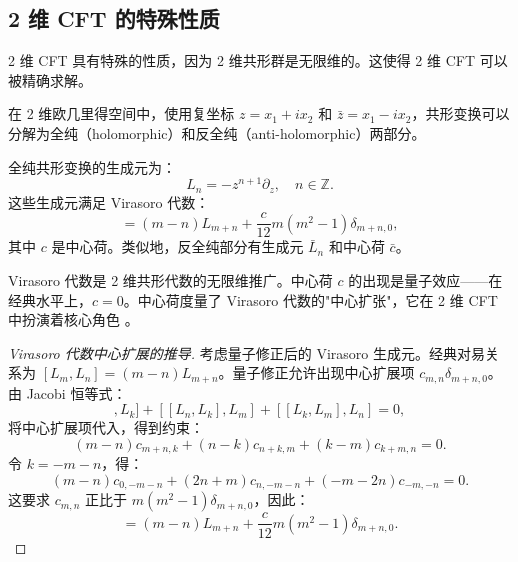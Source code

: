 \subsection{2 维 CFT 的特殊性质}

2 维 CFT 具有特殊的性质，因为 2 维共形群是无限维的。这使得 2 维 CFT 可以被精确求解。

\begin{definition}[Virasoro 代数]
在 2 维欧几里得空间中，使用复坐标 $z = x_1 + ix_2$ 和 $\bar{z} = x_1 - ix_2$，共形变换可以分解为全纯（holomorphic）和反全纯（anti-holomorphic）两部分。

全纯共形变换的生成元为：
\begin{equation}
    L_n = -z^{n+1} \partial_z, \quad n \in \mathbb{Z}.
\end{equation}
这些生成元满足 Virasoro 代数：
\begin{equation}
    [L_m, L_n] = (m-n) L_{m+n} + \frac{c}{12} m(m^2-1) \delta_{m+n, 0},
\end{equation}
其中 $c$ 是中心荷。类似地，反全纯部分有生成元 $\bar{L}_n$ 和中心荷 $\bar{c}$。
\end{definition}

\begin{remark}
Virasoro 代数是 2 维共形代数的无限维推广。中心荷 $c$ 的出现是量子效应——在经典水平上，$c = 0$。中心荷度量了 Virasoro 代数的"中心扩张"，它在 2 维 CFT 中扮演着核心角色 \cite{Zamolodchikov1986}。
\end{remark}

\begin{proof}[Virasoro 代数中心扩展的推导]
考虑量子修正后的 Virasoro 生成元。经典对易关系为 $[L_m, L_n] = (m-n)L_{m+n}$。量子修正允许出现中心扩展项 $c_{m,n} \delta_{m+n,0}$。由 Jacobi 恒等式：
\begin{equation}
    [[L_m, L_n], L_k] + [[L_n, L_k], L_m] + [[L_k, L_m], L_n] = 0,
\end{equation}
将中心扩展项代入，得到约束：
\begin{equation}
    (m-n)c_{m+n,k} + (n-k)c_{n+k,m} + (k-m)c_{k+m,n} = 0.
\end{equation}
令 $k = -m-n$，得：
\begin{equation}
    (m-n)c_{0,-m-n} + (2n+m)c_{n,-m-n} + (-m-2n)c_{-m,-n} = 0.
\end{equation}
这要求 $c_{m,n}$ 正比于 $m(m^2-1)\delta_{m+n,0}$，因此：
\begin{equation}
    [L_m, L_n] = (m-n) L_{m+n} + \frac{c}{12} m(m^2-1) \delta_{m+n, 0}.
\end{equation}
\end{proof}


